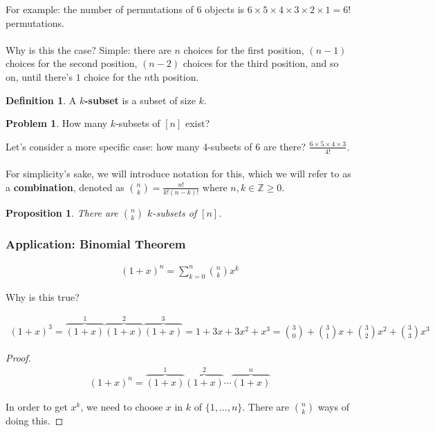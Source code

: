 \documentclass[]{article}
\newtheorem{proposition}{Proposition}[section]
\theoremstyle{definition}
\newtheorem{problem}{Problem}[section]
\newtheorem{defn}{Definition}[section]
\newcommand{\lecture}[1]{\marginpar{{\footnotesize $\leftarrow$ \underline{#1}}}}
\begin{document}
				For example: the number of permutations of $6$ objects is $6 \times 5 \times 4 \times 3 \times 2 \times 1 = 6!$ permutations.
				\\ \\
				Why is this the case? Simple: there are $n$ choices for the first position, $(n - 1)$ choices for the second position, $(n - 2)$ choices for the third position, and so on, until there's $1$ choice for the $n$th position.

				\begin{defn}
					A \textbf{$k$-subset} is a subset of size $k$.
				\end{defn}

				\begin{problem}
					How many $k$-subsets of $[n]$ exist?
				\end{problem}

				Let's consider a more specific case: how many 4-subsets of 6 are there? $\frac{6 \times 5 \times 4 \times 3}{4!}$.
				\\ \\
				For simplicity's sake, we will introduce notation for this, which we will refer to as a \textbf{combination}, denoted as 
					${n \choose k} = \frac{n!}{k!(n-k)!}$ where $n, k \in \mathbb{Z} \ge 0$.
				
				\begin{proposition}
					There are ${n \choose k}$ $k$-subsets of $[n]$.
				\end{proposition}
				
				\subsubsection{Application: Binomial Theorem} \lecture{January 9, 2013}
					\begin{align*}
						(1 + x)^n = \sum_{k = 0}^{n} {n \choose k} x^k
					\end{align*}
					
					Why is this true?
					
					\begin{align*}
						(1 + x)^3 = \overbrace{(1 + x)}^1\overbrace{(1 + x)}^2\overbrace{(1 + x)}^3 = 1 + 3x + 3x^2 + x^3 = {3 \choose 0} + {3 \choose 1}x + {3 \choose 2}x^2 + {3 \choose 3}x^3
					\end{align*}
					
					\begin{proof}
						\begin{align*}
							(1 + x)^n = \overbrace{(1 + x)}^1 \overbrace{(1 + x)}^2 \cdots \overbrace{(1 + x)}^n
						\end{align*}
						
						In order to get $x^k$, we need to choose $x$ in $k$ of $\{1, \ldots, n \}$. There are ${n \choose k}$ ways of doing this.
					\end{proof}
		
\end{document}
